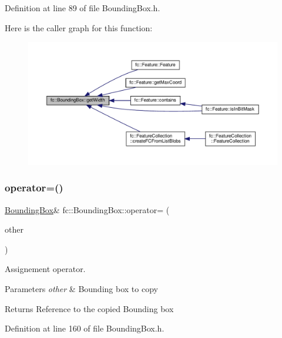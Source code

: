 Definition at line 89 of file Bounding\+Box.\+h.

Here is the caller graph for this function\+:
\nopagebreak
\begin{figure}[H]
\begin{center}
\leavevmode
\includegraphics[width=350pt]{db/dc1/classfc_1_1BoundingBox_aecdcbec558ef3396ed42924d4937d981_icgraph}
\end{center}
\end{figure}
\mbox{\label{classfc_1_1BoundingBox_a80e775cb93499c77462ea281d9740f74}} 
\subsubsection{\texorpdfstring{operator=()}{operator=()}}
{\footnotesize\ttfamily \hyperlink{classfc_1_1BoundingBox}{Bounding\+Box}\& fc\+::\+Bounding\+Box\+::operator= (\begin{DoxyParamCaption}\item[{const \hyperlink{classfc_1_1BoundingBox}{Bounding\+Box} \&}]{other }\end{DoxyParamCaption})\hspace{0.3cm}{\ttfamily [inline]}}



Assignement operator. 


\begin{DoxyParams}{Parameters}
{\em other} & Bounding box to copy \\
\hline
\end{DoxyParams}
\begin{DoxyReturn}{Returns}
Reference to the copied Bounding box 
\end{DoxyReturn}


Definition at line 160 of file Bounding\+Box.\+h.

